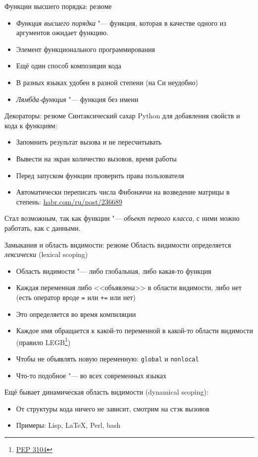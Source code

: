 \begin{frame}[t]{Функции высшего порядка: резюме}
	\begin{itemize}
	\item
		\textit{Функция высшего порядка} "--- функция,
		которая в качестве одного из аргументов ожидает функцию.
	\item
		Элемент функционального программирования
	\item
		Ещё один способ композиции кода
	\item
		В разных языках удобен в разной степени (на Си неудобно)
	\item
		\textit{Лямбда-функция} "--- функция без имени
	\end{itemize}
\end{frame}

\begin{frame}[t]{Декораторы: резюме}
	Синтаксический сахар Python для добавления свойств и кода к функциям:
	\begin{itemize}
	\item Запомнить результат вызова и не пересчитывать
	\item Вывести на экран количество вызовов, время работы
	\item Перед запуском функции проверить права пользователя
	\item
		Автоматически переписать числа Фибоначчи на возведение
		матрицы в степень: \href{https://habr.com/ru/post/236689/}{habr.com/ru/post/236689}
	\end{itemize}
	
	Стал возможным, так как функции "--- \textit{объект первого класса},
	с ними можно работать, как с данными.
\end{frame}

\begin{frame}[t,fragile]{Замыкания и область видимости: резюме}
	Область видимости определяется \textit{лексически} (lexical scoping)
	\begin{itemize}
	\item Область видимости "--- либо глобальная, либо какая-то функция
	\item Каждая переменная либо <<объявлена>> в области видимости, либо нет
		(есть оператор вроде \verb`=` или \verb`+=` или нет)
	\item Это определяется во время компиляции
	\item Каждое имя обращается к какой-то переменной в какой-то области видимости (правило LEGB\footnote{\href{https://www.python.org/dev/peps/pep-3104/}{PEP 3104}})
	\item Чтобы не объявлять новую переменную:
		\verb`global` и \verb`nonlocal`
	\item Что-то подобное "--- во всех современных языках
	\end{itemize}
	
	Ещё бывает динамическая область видимости (dynamical scoping):
	\begin{itemize}
	\item От структуры кода ничего не зависит, смотрим на стэк вызовов
	\item Примеры: Lisp, \LaTeX, Perl, bash
	\end{itemize}
\end{frame}

